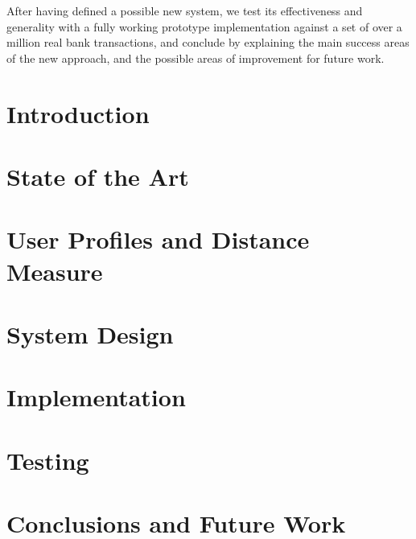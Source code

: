 \documentclass[letterpaper,11pt,oneside,final]{uicthesis}
\begin{document}
   After having defined a possible new system, we test its effectiveness and generality with a fully working prototype implementation against a set of over a million real bank transactions, and conclude by explaining the main success areas of the new approach, and the possible areas of improvement for future work.

	\chapter{Introduction} \label{introduction}
		
	\chapter{State of the Art} \label{soa}
		
	\chapter{User Profiles and Distance Measure} \label{profiles}
		
	\chapter{System Design} \label{design}
		
	\chapter{Implementation} \label{implementation}
		
	\chapter{Testing} \label{test}
		
	\chapter{Conclusions and Future Work} \label{conclusions}
		

	\clearpage

	\clearpage
	\bib
	
	\nocite{*}

	\newpage

	
\end{document}
